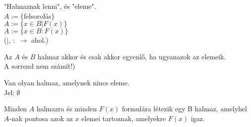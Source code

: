 \begin{frame}
  \begin{tcolorbox}[title={Def.: A halmazelmélet "Definiálatlan alapfogalmai"}]
    "Halmaznak lenni", és "eleme".\\
    $A := \{$felsorolás$\}$\\
    $A := \{ x \in B | F(x) \}$\\
    $A := \{ x \in B : F(x) \}$\\
    {\footnotesize ($|$, $:$ $\rightarrow$ ahol.)}
  \end{tcolorbox}

  \begin{tcolorbox}[title={Def.:  Meghatározottsági Axióma (Halmazok egyenlősége)}]
    Az $A$ és $B$ halmaz akkor és csak akkor egyenlő, ha ugyanazok az elemeik.\\
    {\footnotesize A sorrend nem számít!)}
  \end{tcolorbox}

  \begin{tcolorbox}[title={Def.: Az üres halaz axiómája}]
    Van olyan halmaz, amelynek nincs eleme.\\
    Jel: $\emptyset$
  \end{tcolorbox}

  \begin{tcolorbox}[title={Def.: Részhalmaz-axióma}]
    Minden $A$ halmazra és minden $F(x)$ formulára létezik egy B halmaz, amelyhel $A$-nak pontosa azok az $x$ elemei tartoznak, amelyekre $F(x)$ igaz.
  \end{tcolorbox}
\end{frame}

